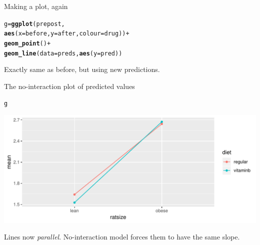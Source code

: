 \documentclass[unknownkeysallowed]{beamer}\usepackage[]{graphicx}\usepackage[]{color}
\makeatletter
\def\maxwidth{ %
  \ifdim\Gin@nat@width>\linewidth
    \linewidth
  \else
    \Gin@nat@width
  \fi
}
\newcommand{\hlopt}[1]{\textcolor[rgb]{0,0,0}{#1}}%
\newcommand{\hlstd}[1]{\textcolor[rgb]{0.345,0.345,0.345}{#1}}%
\newcommand{\hlkwb}[1]{\textcolor[rgb]{0.69,0.353,0.396}{#1}}%
\newcommand{\hlkwc}[1]{\textcolor[rgb]{0.333,0.667,0.333}{#1}}%
\newcommand{\hlkwd}[1]{\textcolor[rgb]{0.737,0.353,0.396}{\textbf{#1}}}%
\newenvironment{kframe}{%
 \def\at@end@of@kframe{}%
 \ifinner\ifhmode%
  \def\at@end@of@kframe{\end{minipage}}%
  \begin{minipage}{\columnwidth}%
 \fi\fi%
 \def\FrameCommand##1{\hskip\@totalleftmargin \hskip-\fboxsep
 \colorbox{shadecolor}{##1}\hskip-\fboxsep
     \hskip-\linewidth \hskip-\@totalleftmargin \hskip\columnwidth}%
 \MakeFramed {\advance\hsize-\width
   \@totalleftmargin\z@ \linewidth\hsize
   \@setminipage}}%
 {\par\unskip\endMakeFramed%
 \at@end@of@kframe}
\newenvironment{knitrout}{}{} %
\makeatother
\begin{document}
\begin{frame}[fragile]{Making a plot, again}

 
\begin{knitrout}
\color{fgcolor}\begin{kframe}
\begin{alltt}
\hlstd{g}\hlkwb{=}\hlkwd{ggplot}\hlstd{(prepost,}
  \hlkwd{aes}\hlstd{(}\hlkwc{x}\hlstd{=before,}\hlkwc{y}\hlstd{=after,}\hlkwc{colour}\hlstd{=drug))}\hlopt{+}
  \hlkwd{geom_point}\hlstd{()}\hlopt{+}
  \hlkwd{geom_line}\hlstd{(}\hlkwc{data}\hlstd{=preds,}\hlkwd{aes}\hlstd{(}\hlkwc{y}\hlstd{=pred))}
\end{alltt}


{\ttfamily\noindent\bfseries\color{errorcolor}{\#\# Error in ggplot(prepost, aes(x = before, y = after, colour = drug)): object 'prepost' not found}}\end{kframe}
\end{knitrout}
 

Exactly same as before, but using new predictions.
  
\end{frame}

\begin{frame}{The no-interaction plot of predicted values}
  
 
\begin{knitrout}
\color{fgcolor}\begin{kframe}
\begin{alltt}
\hlstd{g}
\end{alltt}
\end{kframe}
\includegraphics[width=\maxwidth]{figure/cabazzo-1} 

\end{knitrout}


Lines now \emph{parallel}. No-interaction model forces them
to have the same slope. 

\end{frame}
\end{document}

